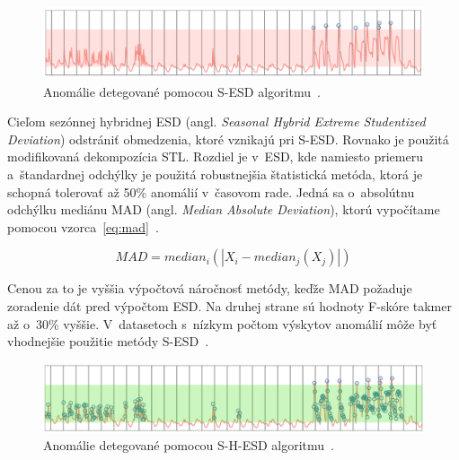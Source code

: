 \documentclass[a4paper,twoside,slovak,12pt,appendix]{article}
\begin{document}
\begin{figure}[htbp]
  \centering
  \includegraphics[width=\textwidth]{sesd_anomalies.png}
  \caption[Anomálie detegované pomocou S-ESD algoritmu.]{Anomálie detegované pomocou S-ESD algoritmu~\cite{Hochenbaum2017}.}
  \label{fig:sesd-anomalies}
\end{figure}

\noindent
Cieľom sezónnej hybridnej ESD (angl. \textit{Seasonal Hybrid Extreme
Studentized Deviation}) odstrániť obmedzenia, ktoré vznikajú pri S-ESD.
Rovnako je použitá modifikovaná dekompozícia STL. Rozdiel je v~ESD, kde
namiesto priemeru a~štandardnej odchýlky je použitá robustnejšia štatistická
metóda, ktorá je schopná tolerovať až 50\% anomálií v~časovom rade. Jedná sa
o~absolútnu odchýlku mediánu MAD (angl. \textit{Median Absolute Deviation}),
ktorú vypočítame pomocou vzorca~\ref{eq:mad}~\cite{Hochenbaum2017}.

\begin{equation}
	\label{eq:mad}
  MAD = median_i(|X_i - median_j(X_j)|)
\end{equation}

\noindent
Cenou za to je vyššia výpočtová náročnosť metódy, keďže MAD požaduje zoradenie
dát pred výpočtom ESD. Na druhej strane sú hodnoty F-skóre takmer až o~30\%
vyššie. V~datasetoch s~nízkym počtom výskytov anomálií môže byť vhodnejšie
použitie metódy S-ESD~\cite{Hochenbaum2017}.

\begin{figure}[htbp]
  \centering
  \includegraphics[width=\textwidth]{shesd_anomalies.png}
  \caption[Anomálie detegované pomocou S-H-ESD algoritmu.]{Anomálie detegované pomocou S-H-ESD algoritmu~\cite{Hochenbaum2017}.}
  \label{fig:shesd-anomalies}
\end{figure}
\end{document}
